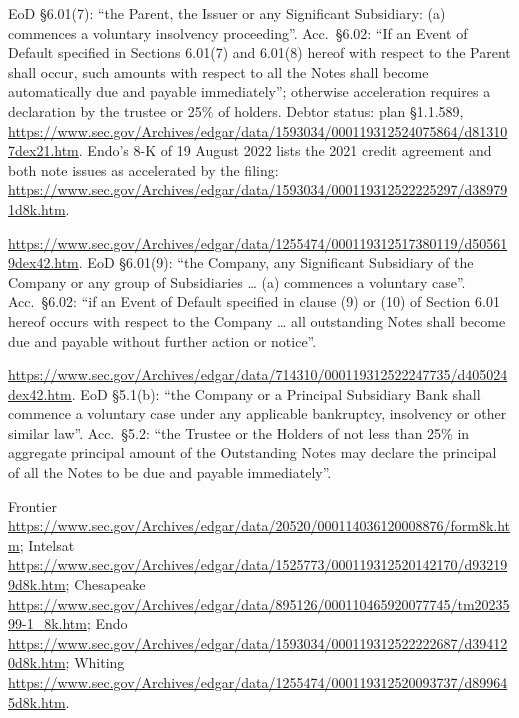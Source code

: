 \documentclass[11pt]{article}
\begin{document}
{\begin{description}[leftmargin=0pt,itemsep=3pt]
EoD \S6.01(7): ``the Parent, the Issuer or any Significant Subsidiary: (a) commences a voluntary insolvency
proceeding''. Acc.\ \S6.02: ``If an Event of Default specified in Sections 6.01(7) and 6.01(8) hereof with
respect to the Parent shall occur, such amounts with respect to all the Notes shall become automatically due
and payable immediately''; otherwise acceleration requires a declaration by the trustee or 25\% of holders.
Debtor status: plan \S1.1.589, \url{https://www.sec.gov/Archives/edgar/data/1593034/000119312524075864/d813107dex21.htm}.
Endo's 8-K of 19 August 2022 lists the 2021 credit agreement and both note issues as accelerated by the
filing: \url{https://www.sec.gov/Archives/edgar/data/1593034/000119312522225297/d389791d8k.htm}.
\item[Whiting 6.625\% notes due 2026.] \url{https://www.sec.gov/Archives/edgar/data/1255474/000119312517380119/d505619dex42.htm}.
EoD \S6.01(9): ``the Company, any Significant Subsidiary of the Company or any group of Subsidiaries \ldots{}
(a) commences a voluntary case''. Acc.\ \S6.02: ``if an Event of Default specified in clause (9) or (10) of
Section 6.01 hereof occurs with respect to the Company \ldots{} all outstanding Notes shall become due and
payable without further action or notice''.
\item[Counterexample: Valley National 6.25\% subordinated notes due 2032.] \url{https://www.sec.gov/Archives/edgar/data/714310/000119312522247735/d405024dex42.htm}.
EoD \S5.1(b): ``the Company or a Principal Subsidiary Bank shall commence a voluntary case under any applicable
bankruptcy, insolvency or other similar law''. Acc.\ \S5.2: ``the Trustee or the Holders of not less than
25\% in aggregate principal amount of the Outstanding Notes may declare the principal of all the Notes to be
due and payable immediately''.
\item[Petition 8-Ks.] Frontier \url{https://www.sec.gov/Archives/edgar/data/20520/000114036120008876/form8k.htm};
Intelsat \url{https://www.sec.gov/Archives/edgar/data/1525773/000119312520142170/d932199d8k.htm};
Chesapeake \url{https://www.sec.gov/Archives/edgar/data/895126/000110465920077745/tm2023599-1_8k.htm};
Endo \url{https://www.sec.gov/Archives/edgar/data/1593034/000119312522222687/d394120d8k.htm};
Whiting \url{https://www.sec.gov/Archives/edgar/data/1255474/000119312520093737/d899645d8k.htm}.
\end{description}
}
\end{document}
